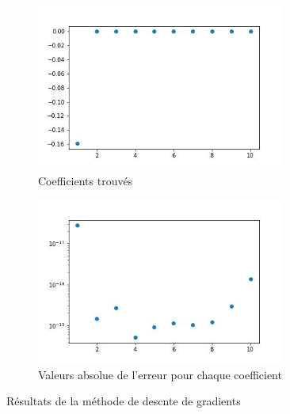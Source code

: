 \documentclass[12pt]{report}
\begin{document}
\begin{figure}
    \centering
    \begin{subfigure}[b]{0.4\textwidth}
        \centering
        \includegraphics[width=0.9\textwidth, height=0.9\textwidth]{coefs_1_DG.jpg}
        \caption{Coefficients trouvés}
    \end{subfigure}
    \hfill
    \begin{subfigure}[b]{0.4\textwidth}
        \centering
        \includegraphics[width=0.9\textwidth, height=0.9\textwidth]{coefs_1_DG_erreur.jpg}
        \caption{Valeurs absolue de l'erreur pour chaque coefficient}
    \end{subfigure}
       \caption{Résultats de la méthode de descnte de gradients}
       \label{fig:résultats 1 DG}
\end{figure}
\end{document}
